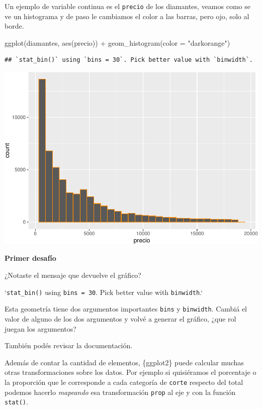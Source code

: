 \documentclass[
  openany]{book}
\newenvironment{Shaded}{\begin{snugshade}}{\end{snugshade}}
\newcommand{\AttributeTok}[1]{\textcolor[rgb]{0.77,0.63,0.00}{#1}}
\newcommand{\FunctionTok}[1]{\textcolor[rgb]{0.00,0.00,0.00}{#1}}
\newcommand{\NormalTok}[1]{#1}
\newcommand{\SpecialCharTok}[1]{\textcolor[rgb]{0.00,0.00,0.00}{#1}}
\newcommand{\StringTok}[1]{\textcolor[rgb]{0.31,0.60,0.02}{#1}}
\begin{document}
Un ejemplo de variable continua es el \texttt{precio} de los diamantes, veamos como se ve un histograma y de paso le cambiamos el color a las barras, pero ojo, solo al borde.

\begin{Shaded}
\begin{Highlighting}[]
\FunctionTok{ggplot}\NormalTok{(diamantes, }\FunctionTok{aes}\NormalTok{(precio)) }\SpecialCharTok{+}
  \FunctionTok{geom\_histogram}\NormalTok{(}\AttributeTok{color =} \StringTok{"darkorange"}\NormalTok{)}
\end{Highlighting}
\end{Shaded}

\begin{verbatim}
## `stat_bin()` using `bins = 30`. Pick better value with `binwidth`.
\end{verbatim}

\begin{center}\includegraphics[width=1\linewidth]{DT6_files/figure-latex/unnamed-chunk-61-1} \end{center}

\textbf{Primer desafío}

¿Notaste el mensaje que devuelve el gráfico?

`\texttt{stat\_bin()} using \texttt{bins\ =\ 30}.
Pick better value with \texttt{binwidth}.`

Esta geometría tiene dos argumentos importantes \texttt{bins} y \texttt{binwidth}.
Cambiá el valor de alguno de los dos argumentos y volvé a generar el gráfico, ¿que rol juegan los argumentos?

También podés revisar la documentación.

Además de contar la cantidad de elementos, \{ggplot2\} puede calcular muchas otras transformaciones sobre los datos.
Por ejemplo si quisiéramos el porcentaje o la proporción que le corresponde a cada categoría de \texttt{corte} respecto del total podemos hacerlo \emph{mapeando} esa transformación \texttt{prop} al eje y con la función \texttt{stat()}.
\end{document}
